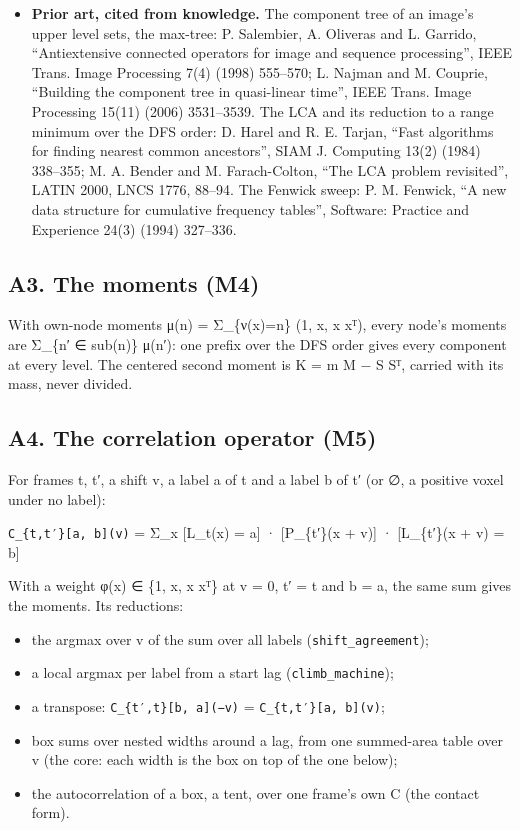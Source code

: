 \begin{itemize}
\item \textbf{Prior art, cited from knowledge.} The component tree of an image's upper level sets, the max-tree: P. Salembier, A. Oliveras and L. Garrido, “Antiextensive connected operators for image and sequence processing”, IEEE Trans. Image Processing 7(4) (1998) 555–570; L. Najman and M. Couprie, “Building the component tree in quasi-linear time”, IEEE Trans. Image Processing 15(11) (2006) 3531–3539. The LCA and its reduction to a range minimum over the DFS order: D. Harel and R. E. Tarjan, “Fast algorithms for finding nearest common ancestors”, SIAM J. Computing 13(2) (1984) 338–355; M. A. Bender and M. Farach-Colton, “The LCA problem revisited”, LATIN 2000, LNCS 1776, 88–94. The Fenwick sweep: P. M. Fenwick, “A new data structure for cumulative frequency tables”, Software: Practice and Experience 24(3) (1994) 327–336.
\end{itemize}

\subsection{\texorpdfstring{A3. The moments (M4)}{A3. The moments (M4)}}

With own-node moments μ(n) = Σ\_\allowbreak{}\{ν(x)=n\} (1, x, x xᵀ), every node's moments are Σ\_\allowbreak{}\{n′ ∈ sub(n)\} μ(n′): one prefix over the DFS order gives every component at every level. The centered second moment is K = m M − S Sᵀ, carried with its mass, never divided.

\subsection{\texorpdfstring{A4. The correlation operator (M5)}{A4. The correlation operator (M5)}}

For frames t, t′, a shift v, a label a of t and a label b of t′ (or ∅, a positive voxel under no label):

\texttt{C\_\allowbreak{}\{t,t′\}[a, b](v)} = Σ\_\allowbreak{}x [L\_\allowbreak{}t(x) = a] · [P\_\allowbreak{}\{t′\}(x + v)] · [L\_\allowbreak{}\{t′\}(x + v) = b]

With a weight φ(x) ∈ \{1, x, x xᵀ\} at v = 0, t′ = t and b = a, the same sum gives the moments. Its reductions:

\begin{itemize}
\item the argmax over v of the sum over all labels (\texttt{shift\_\allowbreak{}agreement});
\item a local argmax per label from a start lag (\texttt{climb\_\allowbreak{}machine});
\item a transpose: \texttt{C\_\allowbreak{}\{t′,t\}[b, a](−v)} = \texttt{C\_\allowbreak{}\{t,t′\}[a, b](v)};
\item box sums over nested widths around a lag, from one summed-area table over v (the core: each width is the box on top of the one below);
\item the autocorrelation of a box, a tent, over one frame's own C (the contact form).
\end{itemize}

